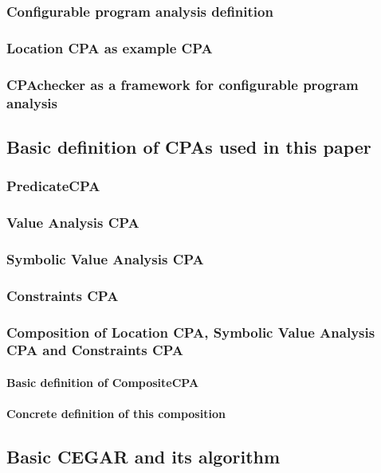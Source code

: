 \documentclass[a4paper,11pt]{article}
\begin{document}
\subsubsection{Configurable program analysis definition}
\subsubsection{Location CPA as example CPA}
\subsubsection{CPAchecker as a framework for configurable program analysis}

\subsection{Basic definition of CPAs used in this paper}
\subsubsection{PredicateCPA}
\subsubsection{Value Analysis CPA}
\subsubsection{Symbolic Value Analysis CPA}
\subsubsection{Constraints CPA}
\subsubsection{Composition of Location CPA, Symbolic Value Analysis CPA and Constraints CPA}
\paragraph{Basic definition of CompositeCPA}
\paragraph{Concrete definition of this composition}

\subsection{Basic CEGAR and its algorithm}
\end{document}
